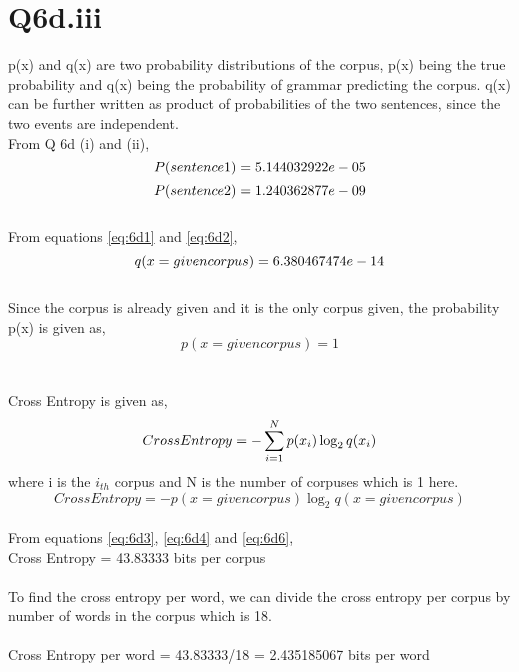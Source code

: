 \documentclass[12pt]{article}
\begin{document}
\section*{Q6d.iii}
p(x) and q(x) are two probability distributions of the corpus, p(x) being the true probability and q(x) being the probability of grammar predicting the corpus. q(x) can be further written as product of probabilities of the two sentences, since the two events are independent.
\\
From Q 6d (i) and (ii),\\
\begin{equation}
\label{eq:6d1}
P(sentence1) = 5.144032922e-05\\
\end{equation}
\begin{equation}
\label{eq:6d2}
P(sentence2) = 1.240362877e-09\\
\end{equation}
\\
From equations \ref{eq:6d1} and \ref{eq:6d2},\\
\begin{equation}
\label{eq:6d3}
q(x = given corpus) = 6.380467474e-14\\
\end{equation}
\\
Since the corpus is already given and it is the only corpus given, the probability p(x) is given as,\\
\begin{equation}
\label{eq:6d4}
p(x = given corpus) = 1
\end{equation}
\\
\\
Cross Entropy is given as,\\
\begin{equation}
\label{eq:6d5}
	Cross Entropy = -\sum_{i=1}^{N}p(x_i)\log_2 q(x_i)\\
\end{equation}
where i is the \(i_{th}\) corpus and N is the number of corpuses which is 1 here.\\
\begin{equation}
\label{eq:6d6}
	Cross Entropy = -p(x=given corpus)\log_2 q(x=given corpus)
\end{equation}
\\
From equations \ref{eq:6d3}, \ref{eq:6d4} and \ref{eq:6d6},\\
Cross Entropy = 43.83333 bits per corpus\\
\\
To find the cross entropy per word, we can divide the cross entropy per corpus by number of words in the corpus which is 18.\\
\\
Cross Entropy per word = 43.83333/18 = 2.435185067 bits per word\\
\end{document}
